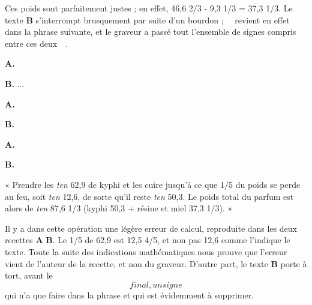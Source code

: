 \documentclass[a4paper, 11pt, oneside]{article}
\newcommand*\hieroAAAE{}
\newcommand*\hieroAAAH{}
\newcommand*\hieroAAAR{}
\newcommand*\hieroAACA{}
\newcommand*\hieroAACQ{}
\newcommand*\hieroAACR{}
\newcommand*\hieroAAEI{}
\newcommand*\hieroAAEK{}
\newcommand*\hieroAAFT{}
\newcommand*\hieroAAGA{}
\newcommand*\hieroAAGI{}
\newcommand*\hieroAAGM{}
\newcommand*\hieroAAGN{}
\newcommand*\hieroAAHJ{}
\newcommand*\hieroAAHK{}
\newcommand*\hieroAAIG{}
\newcommand*\hieroAAIT{}
\newcommand*\hieroAAIU{}
\newcommand*\hieroAAJB{}
\newcommand*\hieroAAJU{}
\newcommand*\hieroAAJV{}
\newcommand*\hieroAALJ{}
\newcommand*\hieroAAMQ{}
\newcommand*\hieroAAOU{}
\newcommand*\hieroAAPI{}
\newcommand*\hieroAAQZ{}
\newcommand*\hieroAARB{}
\newcommand*\hieroAARC{}
\newcommand*\hieroAASF{}
\newcommand*\hieroAASG{}
\newcommand*\hieroAASH{}
\newcommand*\hieroAASI{}
\newcommand*\hieroAASJ{}
\newcommand*\hieroAASK{}
\newcommand*\hieroAASL{}
\newcommand*\hieroAASM{}
\begin{document}
Ces poids sont parfaitement justes ; en effet, 46,6 2/3 - 9,3 1/3 = 37,3 1/3. Le texte \textbf{B} s'interrompt brusquement par suite d'un bourdon ; $\hieroAARB\:\hieroAARC\:\hieroAAEI\:\hieroAACA$ revient en effet dans la phrase suivante, et le graveur a passé tout l'ensemble de signes compris entre ces deux $\hieroAARB\:\hieroAARC\:\hieroAAEI\:\hieroAACA$. 

\hspace*{10mm}\textbf{A.}\hspace*{5mm} $\hieroAACQ\:\hieroAAAE\:\hieroAAAR\:\hieroAAOU\:\hieroAAMQ\:\hieroAAMQ\:\hieroAAGA\:\hieroAAJU\:\hieroAAHJ\:\hieroAACR\:\hieroAASF\:\hieroAAAH\:\hieroAACA\:\hieroAAQZ\:\hieroAASG\:\hieroAASH\:\hieroAASI\:\hieroAARB\:\hieroAARC\:\hieroAAEI\:\hieroAACA$

\hspace*{10mm}\textbf{B.}\hspace*{5mm} ...

\hspace*{10mm}\textbf{A.}\hspace*{5mm} $\hieroAAIT\:\hieroAAIU\:\hieroAAGA\:\hieroAAGI\:\hieroAAJV\:\hieroAAPI\:\hieroAASJ\:\hieroAAGA\:\hieroAAHJ$ \hspace*{22mm} $\hieroAAGN\:\hieroAAAE\:\hieroAAAR\:\hieroAALJ$

\hspace*{10mm}\textbf{B.}\hspace*{5mm} $\hieroAAGN\:\hieroAAFT\:\hieroAAIU\:\hieroAAGA\:\hieroAAJB\:\hieroAASK\:\hieroAAGN\:\hieroAAFT\:\hieroAASJ\:\hieroAAGA\:\hieroAAJB\:\hieroAAHJ\:$ \hspace*{8mm} $\hieroAAGN\:\hieroAAEK\:\hieroAASL$

\hspace*{10mm}\textbf{A.}\hspace*{5mm} $\hieroAASM\:\hieroAAGM\:\hieroAAGA\:\hieroAAJU\:\hieroAAHK$

\hspace*{10mm}\textbf{B.}\hspace*{5mm} $\hieroAASM\:\hieroAAGI\:\hieroAAHJ\:\hieroAAGA\:\hieroAAJB\:\hieroAAGI\:\hieroAAJV\:\hieroAAIG\:\hieroAAHK$

« Prendre les \emph{ten} 62,9 de kyphi et les cuire jusqu'à ce que 1/5 du poids se perde au feu, soit \emph{ten} 12,6, de sorte qu'il reste \emph{ten} 50,3. Le poids total du parfum est alors de \emph{ten} 87,6 1/3 (kyphi 50,3 + résine et miel 37,3 1/3). »

Il y a dans cette opération une légère erreur de calcul, reproduite dans les deux recettes \textbf{A} \textbf{B}. Le 1/5 de 62,9 est 12,5 4/5, et non pas 12,6 comme l'indique le texte. Toute la suite des indications mathématiques nous prouve que l'erreur vient de l'auteur de la recette, et non du graveur. D'autre part, le texte \textbf{B} porte à tort, avant le $\hieroAAHK$ final, un signe $\hieroAAIG$ qui n'a que faire dans la phrase et qui est évidemment à supprimer.
\end{document}
